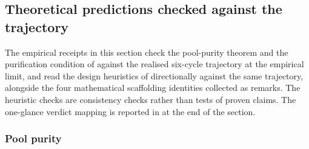 

\FloatBarrier

\subsection{Theoretical predictions checked against the trajectory}
\label{sec:theory-checks}

The empirical receipts in this section check the pool-purity theorem and the purification condition of  against the realised six-cycle trajectory at the empirical limit, and read the design heuristics of  directionally against the same trajectory, alongside the four mathematical scaffolding identities collected as remarks. The heuristic checks are consistency checks rather than tests of proven claims. The one-glance verdict mapping is reported in  at the end of the section.

\subsubsection{Pool purity}
\label{sec:check-purity}

